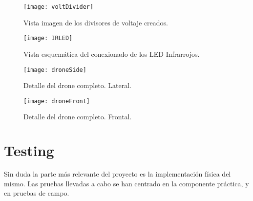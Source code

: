 \begin{figure}[H]
	\centering
	\texttt{[image: voltDivider]}
	\caption[Divisor de voltaje]{Vista imagen de los divisores de voltaje creados.}\label{fig:imgVoltDiv}
\end{figure}

\begin{figure}[H]
	\centering
	\texttt{[image: IRLED]}
	\caption[LED IR]{Vista esquemática del conexionado de los LED Infrarrojos.}\label{fig:schIRLED}
\end{figure}

\begin{figure}[H]
	\centering
	\texttt{[image: droneSide]}
	\caption[Lateral del drone]{Detalle del drone completo. Lateral.}\label{fig:droneSideView}
\end{figure}

\begin{figure}[H]
	\centering
	\texttt{[image: droneFront]}
	\caption[Frontal del drone]{Detalle del drone completo. Frontal.}\label{fig:droneFrontView}
\end{figure}


\section{Testing}
\label{sec:testing}
Sin duda la parte más relevante del proyecto es la implementación física del mismo. Las pruebas llevadas a cabo se han centrado en la componente práctica, y en pruebas de campo. 

